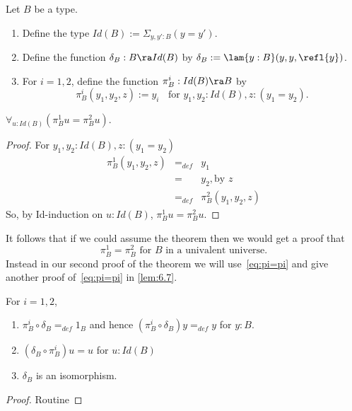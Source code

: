 \begin{defn} Let $B$ be a type.
\begin{enumerate}
\item Define the type $Id(B):=\Sigma_{y,y':B}(y=y')$.
\item Define the function $\delta_B:B\ra Id(B)$ by
$\delta_B:=\lam{y:B}(y,y,\refl{y})$.
\item For $i=1,2$, define  the function $\pi^i_B:Id(B)\ra B$ by
  \[ \pi^i_B(y_1,y_2,z):= y_i\;\;\mbox{ for }y_1,y_2:Id(B), z:(y_1=y_2).\]
\end{enumerate}
\end{defn}
\begin{thm}
$\forall_{u:Id(B)}(\pi^1_Bu = \pi^2_Bu)$.
\end{thm}
\begin{proof}
For $y_1,y_2:Id(B), z:(y_1=y_2)$
  \[\begin{array}{lll}
\pi^1_B(y_1,y_2,z)&=_{def}& y_1\\
                 &=&y_2, \mbox{by } z\\
                 &=_{def}&\pi^2_B(y_1,y_2,z)
  \end{array}\]
So, by Id-induction on $u:Id(B)$, $\pi^1_Bu = \pi^2_Bu$.  
\end{proof}

It follows that if we could assume
the theorem then we would get a proof that 
\begin{equation}
  \pi^1_B = \pi^2_B\mbox{ for $B$ in a univalent universe.}\label{eq:pi=pi}
\end{equation}
Instead in our second proof of the theorem we will use~\eqref{eq:pi=pi}
and give another proof of~\eqref{eq:pi=pi} in \autoref{lem:6.7}.

\begin{lem}\label{fe:lem-delta-equiv} \label{lem:4.9}
For $i=1,2$,
\begin{enumerate}
\item $\pi^i_B\circ\delta_B =_{def} 1_B$ and hence 
$(\pi^i_B\circ\delta_B)y =_{def} y$ for $y:B$.
\item $(\delta_B\circ\pi^i_B)u = u$ for $u:Id(B)$
\item $\delta_B$ is an isomorphism.
\end{enumerate}
\end{lem}
\begin{proof} Routine
\end{proof}


